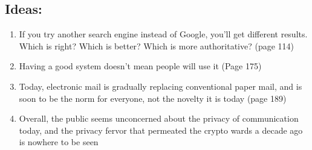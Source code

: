 \documentclass{scrartcl}
\begin{document}
\subsection{Ideas:}
\label{sec:org6720929}
\begin{enumerate}
\item If you try another search engine instead of Google, you'll get different
results. Which is right? Which is better? Which is more authoritative? (page 114)
\item Having a good system doesn't mean people will use it (Page 175)
\item Today, electronic mail is gradually replacing conventional paper mail, and is
soon to be the norm for everyone, not the novelty it is today (page 189)
\item Overall, the public seems unconcerned about the privacy of communication
today, and the privacy fervor that permeated the crypto wards a decade ago is
nowhere to be seen
\end{enumerate}
\end{document}
